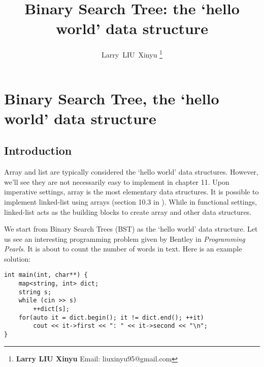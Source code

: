 \documentclass[b5paper]{article}
\begin{document}
\title{Binary Search Tree: the `hello world' data structure}

\author{Larry~LIU~Xinyu
\thanks{{\bfseries Larry LIU Xinyu } \newline
  Email: liuxinyu95@gmail.com \newline}
  }

\maketitle
\fi


\ifx\wholebook\relax
\chapter{Binary Search Tree, the `hello world' data structure}
\fi

\section{Introduction}
\label{introduction} 

Array and list are typically considered the `hello world' data structures. However, we'll see they are not necessarily easy to implement in chapter 11. Upon imperative settings, array is the most elementary data structures. It is possible to implement linked-list using arrays (section  10.3 in \cite{CLRS}). While in functional settings, linked-list acts as the building blocks to create array and other data structures.

We start from Binary Search Trees (BST) as the `hello world' data structure. Let us see an interesting programming problem given by Bentley in {\em Programming Pearls}\cite{Bentley}. It is about to count the number of words in text. Here is an example solution:

\lstset{language=C++, frame=single}
\begin{lstlisting}
int main(int, char**) {
    map<string, int> dict;
    string s;
    while (cin >> s)
        ++dict[s];
    for(auto it = dict.begin(); it != dict.end(); ++it)
        cout << it->first << ": " << it->second << "\n";
}
\end{lstlisting}
\end{document}
